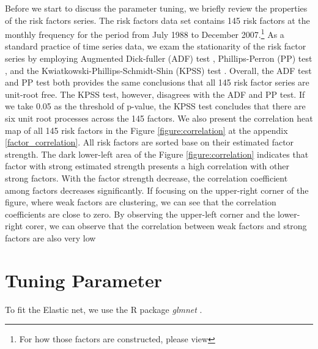 Before we start to discuss the parameter tuning, we briefly review the properties of the risk factors series.
The risk factors data set contains 145 risk factors at the monthly frequency for the period from July 1988 to December 2007.\footnote{For how those factors are constructed, please view }
As a standard practice of time series data, we exam the stationarity of the risk factor series by employing Augmented Dick-fuller (ADF) test  \cite{Dickey1979},  Phillips-Perron (PP) test \cite{Phillips1988}, and the Kwiatkowski-Phillips-Schmidt-Shin (KPSS) test \cite{Kwiatkowski1992}.
Overall, the ADF test and PP test both provides the same conclusions that all 145 risk factor series are unit-root free.
The KPSS test, however, disagrees with the ADF and PP test.
If we take 0.05 as the threshold of p-value, the KPSS test concludes that there are six unit root processes across the 145 factors.
We also present the correlation heat map of all 145 risk factors in the Figure \ref{figure:correlation} at the appendix \ref{factor_correlation}.
All risk factors are sorted base on their estimated factor strength.
The dark lower-left area of the Figure \ref{figure:correlation} indicates that factor with strong estimated strength presents a high correlation with other strong factors.
With the factor strength decrease, the correlation coefficient among factors decreases significantly.
If focusing on the upper-right corner of the figure, where weak factors are clustering, we can see that the correlation coefficients are close to zero.
By observing the upper-left corner and the lower-right corer, we can observe that the correlation between weak factors and strong factors are also very low


\section{Tuning Parameter} \label{EN:parameter_tuning }
To fit the Elastic net, we use the R package \textit{glmnet} \cite{Friedman2010, Simon2011}.


